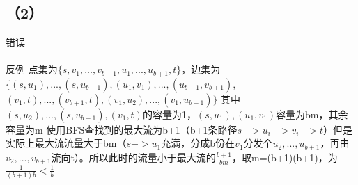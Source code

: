 \documentclass[a4paper,10pt]{article}
\begin{document}
  \subsection{（2）} 错误
  \paragraph{}反例
  点集为$\{s, v_1,...,v_{b+1}, u_1,...,u_{b+1}, t\}$，边集为
                                                     $\{(s,u_1),...,(s,u_{b+1}),(u_1,v_1),...,(u_{b+1},v_{b+1})$,
                                                     $(v_1,t),...,(v_{b+1},t),(v_1,u_2),...,(v_1,u_{b+1})\}$
  其中$(s,u_2),...,(s,u_{b+1}),(v_1,t)$的容量为1，$(s,u_1),(u_1,v_1)$容量为bm，其余容量为m
  使用BFS查找到的最大流为b+1（b+1条路径$s->u_i->v_i->t$）但是实际上最大流流量大于bm（$s->u_1$充满，分成b份在$v_1$分发个$u_2,...,u_{b+1}$，再由$v_2,...,v_{b+1}$流向t）。所以此时的流量小于最大流的$\frac{b+1}{bm}$，取m=(b+1)(b+1)，为$\frac{1}{(b+1)b}<\frac{1}{b}$
\end{document}
